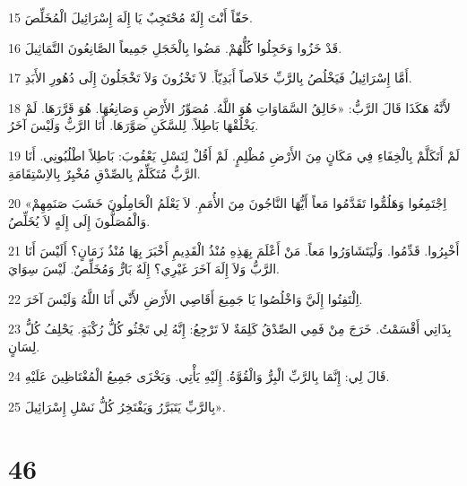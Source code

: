 \par 15 حَقّاً أَنْتَ إِلَهٌ مُحْتَجِبٌ يَا إِلَهَ إِسْرَائِيلَ الْمُخَلِّصَ.
\par 16 قَدْ خَزُوا وَخَجِلُوا كُلُّهُمْ. مَضُوا بِالْخَجَلِ جَمِيعاً الصَّانِعُونَ التَّمَاثِيلَ.
\par 17 أَمَّا إِسْرَائِيلُ فَيَخْلُصُ بِالرَّبِّ خَلاَصاً أَبَدِيّاً. لاَ تَخْزُونَ وَلاَ تَخْجَلُونَ إِلَى دُهُورِ الأَبَدِ.
\par 18 لأَنَّهُ هَكَذَا قَالَ الرَّبُّ: «خَالِقُ السَّمَاوَاتِ هُوَ اللَّهُ. مُصَوِّرُ الأَرْضِ وَصَانِعُهَا. هُوَ قَرَّرَهَا. لَمْ يَخْلُقْهَا بَاطِلاً. لِلسَّكَنِ صَوَّرَهَا. أَنَا الرَّبُّ وَلَيْسَ آخَرُ.
\par 19 لَمْ أَتَكَلَّمْ بِالْخِفَاءِ فِي مَكَانٍ مِنَ الأَرْضِ مُظْلِمٍ. لَمْ أَقُلْ لِنَسْلِ يَعْقُوبَ: بَاطِلاً اطْلُبُونِي. أَنَا الرَّبُّ مُتَكَلِّمٌ بِالصِّدْقِ مُخْبِرٌ بِالاِسْتِقَامَةِ.
\par 20 «اِجْتَمِعُوا وَهَلُمُّوا تَقَدَّمُوا مَعاً أَيُّهَا النَّاجُونَ مِنَ الأُمَمِ. لاَ يَعْلَمُ الْحَامِلُونَ خَشَبَ صَنَمِهِمْ وَالْمُصَلُّونَ إِلَى إِلَهٍ لاَ يُخَلِّصُ.
\par 21 أَخْبِرُوا. قَدِّمُوا. وَلْيَتَشَاوَرُوا مَعاً. مَنْ أَعْلَمَ بِهَذِهِ مُنْذُ الْقَدِيمِ أَخْبَرَ بِهَا مُنْذُ زَمَانٍ؟ أَلَيْسَ أَنَا الرَّبُّ وَلاَ إِلَهَ آخَرَ غَيْرِي؟ إِلَهٌ بَارٌّ وَمُخَلِّصٌ. لَيْسَ سِوَايَ.
\par 22 اِلْتَفِتُوا إِلَيَّ وَاخْلُصُوا يَا جَمِيعَ أَقَاصِي الأَرْضِ لأَنِّي أَنَا اللَّهُ وَلَيْسَ آخَرَ.
\par 23 بِذَاتِي أَقْسَمْتُ. خَرَجَ مِنْ فَمِي الصِّدْقُ كَلِمَةٌ لاَ تَرْجِعُ: إِنَّهُ لِي تَجْثُو كُلُّ رُكْبَةٍ. يَحْلِفُ كُلُّ لِسَانٍ.
\par 24 قَالَ لِي: إِنَّمَا بِالرَّبِّ الْبِرُّ وَالْقُوَّةُ. إِلَيْهِ يَأْتِي. وَيَخْزَى جَمِيعُ الْمُغْتَاظِينَ عَلَيْهِ.
\par 25 بِالرَّبِّ يَتَبَرَّرُ وَيَفْتَخِرُ كُلُّ نَسْلِ إِسْرَائِيلَ».

\chapter{46}

